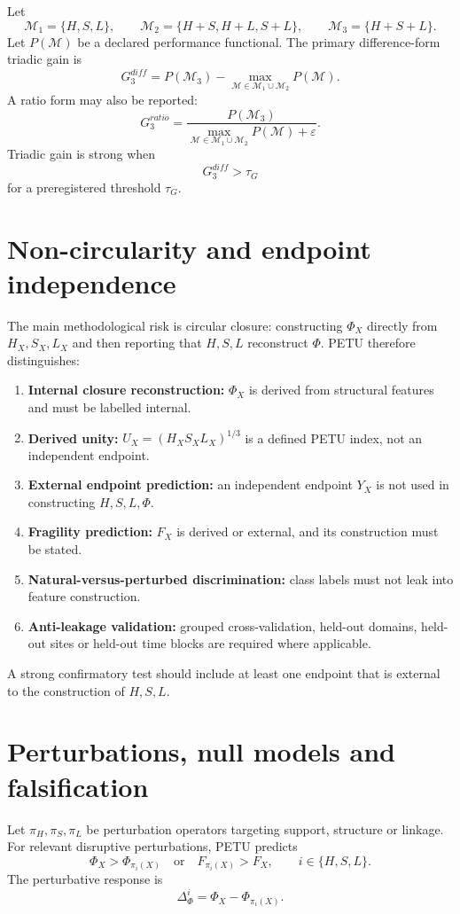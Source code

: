 \documentclass[11pt,a4paper]{article}
\begin{document}
Let
\[
\mathcal{M}_1=\{H,S,L\},\qquad
\mathcal{M}_2=\{H+S,H+L,S+L\},\qquad
\mathcal{M}_3=\{H+S+L\}.
\]
Let $P(\mathcal{M})$ be a declared performance functional.
The primary difference-form triadic gain is
\[
G_3^{diff}
=
P(\mathcal{M}_3)
-
\max_{\mathcal{M}\in\mathcal{M}_1\cup\mathcal{M}_2}P(\mathcal{M}).
\]
A ratio form may also be reported:
\[
G_3^{ratio}
=
\frac{P(\mathcal{M}_3)}
{\max_{\mathcal{M}\in\mathcal{M}_1\cup\mathcal{M}_2}P(\mathcal{M})+\varepsilon}.
\]
Triadic gain is strong when
\[
G_3^{diff}>\tau_G
\]
for a preregistered threshold $\tau_G$.

\section{Non-circularity and endpoint independence}

The main methodological risk is circular closure: constructing $\Phi_X$ directly from $H_X,S_X,L_X$ and then reporting that $H,S,L$ reconstruct $\Phi$.
PETU therefore distinguishes:
\begin{enumerate}
\item \textbf{Internal closure reconstruction:} $\Phi_X$ is derived from structural features and must be labelled internal.
\item \textbf{Derived unity:} $U_X=(H_XS_XL_X)^{1/3}$ is a defined PETU index, not an independent endpoint.
\item \textbf{External endpoint prediction:} an independent endpoint $Y_X$ is not used in constructing $H,S,L,\Phi$.
\item \textbf{Fragility prediction:} $F_X$ is derived or external, and its construction must be stated.
\item \textbf{Natural-versus-perturbed discrimination:} class labels must not leak into feature construction.
\item \textbf{Anti-leakage validation:} grouped cross-validation, held-out domains, held-out sites or held-out time blocks are required where applicable.
\end{enumerate}

A strong confirmatory test should include at least one endpoint that is external to the construction of $H,S,L$.

\section{Perturbations, null models and falsification}

Let $\pi_H,\pi_S,\pi_L$ be perturbation operators targeting support, structure or linkage.
For relevant disruptive perturbations, PETU predicts
\[
\Phi_X>\Phi_{\pi_i(X)}
\quad\text{or}\quad
F_{\pi_i(X)}>F_X,
\qquad i\in\{H,S,L\}.
\]
The perturbative response is
\[
\Delta_\Phi^i=\Phi_X-\Phi_{\pi_i(X)}.
\]
\end{document}
